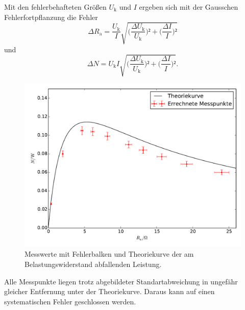 Mit den fehlerbehafteten Größen $U_\mathup{k}$ und $I$ ergeben sich mit der Gausschen Fehlerfortpflanzung die Fehler
\begin{equation}
\Delta{R_\mathup{a}}=\frac{U_\mathup{k}}{I}
\sqrt{\biggl(\frac{\Delta{U_\mathup{k}}}{U_\mathup{k}}\biggr)²+\biggl(\frac{\Delta{I}}{I}\biggr)²}
\end{equation}
und
\begin{equation}
\Delta{N}=U_\mathup{k}I\sqrt{\biggl(\frac{\Delta{U_\mathup{k}}}{U_\mathup{k}}\biggr)²+\biggl(\frac{\Delta{I}}{I}\biggr)²}.
\end{equation}
\begin{figure}[h]
	\centering
	\label{fig:N}
	\includegraphics[width=\textwidth]{content/plot_L.pdf}
	\caption{Messwerte mit Fehlerbalken und Theoriekurve der am Belastungswiderstand abfallenden Leistung.}
\end{figure}

Alle Messpunkte liegen trotz abgebildeter Standartabweichung in ungefähr gleicher Entfernung unter der Theoriekurve. Daraus kann auf einen systematischen Fehler geschlossen werden.
